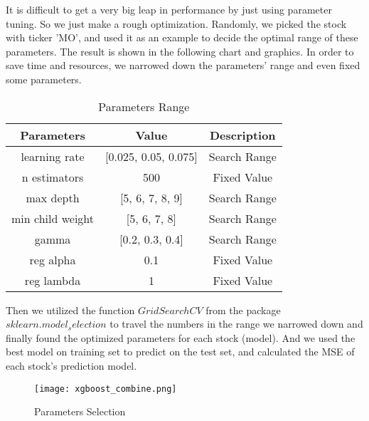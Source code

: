 \documentclass[fleqn,10pt]{SelfArx} %
\begin{document}
\noindent
It is difficult to get a very big leap in performance by just using parameter tuning. So we just make a rough optimization. Randomly, we picked the stock with ticker 'MO', and used it as an example to decide the optimal range of these parameters. The result is shown in the following chart and graphics. In order to save time and resources, we narrowed down the parameters' range and even fixed some parameters.  

\begin{table}[h]
  \centering
\caption{Parameters Range}
\begin{tabular}{ |c|c|c| }
      \hline
      Parameters & Value & Description\\
      \hline
      learning rate & [0.025, 0.05, 0.075] & Search Range\\
      \hline
      n estimators & 500 & Fixed Value\\
      \hline
      max depth & [5, 6, 7, 8, 9] & Search Range\\
      \hline
      min child weight & [5, 6, 7, 8] & Search Range\\
      \hline
      gamma & [0.2, 0.3, 0.4] & Search Range\\
      \hline
      reg alpha & 0.1 & Fixed Value\\
      \hline
      reg lambda & 1 & Fixed Value \\
      \hline
  \end{tabular}
  \label{tab:2}
\end{table}
\noindent
Then we utilized the function $GridSearchCV$ from the package $sklearn.model_selection$ to travel the numbers in the range we narrowed down and finally found the optimized parameters for each stock (model). And we used the best model on training set to predict on the test set, and calculated the MSE of each stock's prediction model.

\begin{figure}[hbtp]\centering %
\texttt{[image: xgboost\_combine.png]}
\caption{Parameters Selection}
\label{fig:view}
\end{figure}
\end{document}
